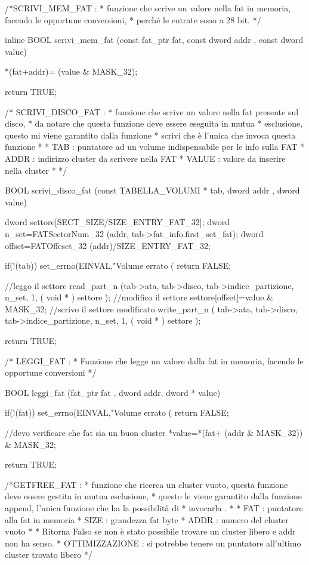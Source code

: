 /*SCRIVI_MEM_FAT : 
 * funzione che scrive un valore nella fat in memoria,  facendo le opportune conversioni, 
 * perché le entrate sono a 28 bit.  
 */

inline BOOL scrivi_mem_fat (const fat_ptr fat, const dword addr , const dword value) {
  
   *(fat+addr)= (value & MASK_32);
  
  return TRUE; 
}

/* SCRIVI_DISCO_FAT :
 * funzione che scrive un valore nella fat presente sul disco, 
 * da notare che questa funzione deve essere eseguita in mutua 
 * esclusione, questo mi viene garantito dalla funzione 
 * scrivi che è l'unica che invoca questa funzione 
 * 
 * TAB   : puntatore ad un volume indispensabile per le info sulla FAT 
 * ADDR  : indirizzo cluster da scrivere nella FAT
 * VALUE : valore da inserire nella cluster
 * 
*/

BOOL scrivi_disco_fat (const TABELLA_VOLUMI * tab, dword addr , dword value) {
  
  dword settore[SECT_SIZE/SIZE_ENTRY_FAT_32]; 
  dword n_set=FATSectorNum_32 (addr, tab->fat_info.first_set_fat);
  dword offset=FATOffeset_32 (addr)/SIZE_ENTRY_FAT_32;

  if(!(tab)) {
    set_errno(EINVAL,"Volume errato (%
    return FALSE; 
  }
  
  //leggo il settore  
  read_part_n (tab->ata, tab->disco, tab->indice_partizione, n_set, 1, ( void * ) settore );
  //modifico il settore 
  settore[offset]=value & MASK_32;
  //scrivo il settore modificato 
  write_part_n ( tab->ata, tab->disco, tab->indice_partizione, n_set, 1, ( void * ) settore );
  
  return TRUE; 
  
}

/* LEGGI_FAT : 
 * Funzione che legge un valore dalla fat in memoria, facendo le opportune conversioni 
 */

BOOL leggi_fat  (fat_ptr fat , dword addr, dword * value) { 
  
  if(!(fat)) {
    set_errno(EINVAL,"Volume errato (%
    return FALSE; 
  }
  
  //devo verificare che fat sia un buon cluster   
  *value=*(fat+ (addr & MASK_32)) & MASK_32;
 
  return TRUE; 
  
}



/*GETFREE_FAT :
 * funzione che ricerca un cluster vuoto, questa  funzione deve essere gestita in mutua esclusione, 
 * questo le viene garantito dalla funzione append, l'unica funzione che ha la possibilità di 
 * invocarla .
 * 
 * FAT : puntatore alla fat in memoria 
 * SIZE : grandezza fat byte
 * ADDR : numero del cluster vuoto
 *
 * Ritorna Falso se non è stato possibile trovare un cluster libero e addr non ha senso.
 * OTTIMIZZAZIONE : si potrebbe tenere un puntatore all'ultimo cluster trovato libero 
 */  


